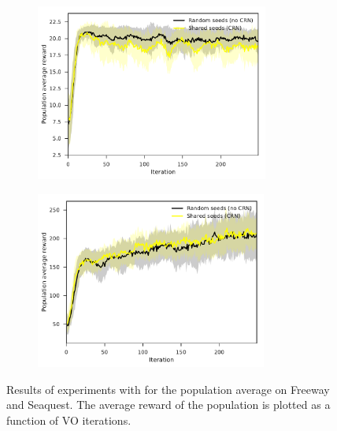 \begin{figure}[tbp!]
    \begin{subfigure}[b]{0.49\textwidth}
        \centering
        \includegraphics[height=5.8cm]{graphics/E028-CRN-R1-analysis/return_avg-all-series-mean-sd.pdf}
        \caption{}
        \label{fig: Theory: E028-CRN-R1-analysis/return_unp-all-series-mean-sd}
    \end{subfigure}
    \hfill
    \begin{subfigure}[b]{0.49\textwidth}
        \centering
        \includegraphics[height=5.8cm]{graphics/E028-CRN-R2-analysis/return_avg-all-series-mean-sd.pdf}
        \caption{}
        \label{fig: Theory: E028-CRN-R2-analysis/return_unp-all-series-mean-sd}
    \end{subfigure}
    \caption{
        Results of experiments with  for the population average on  Freeway and  Seaquest. The average reward of the population is plotted as a function of \gls{VO} iterations.
    }
    \label{fig: Theory: E028-CRN-R-analysis}
\end{figure}


